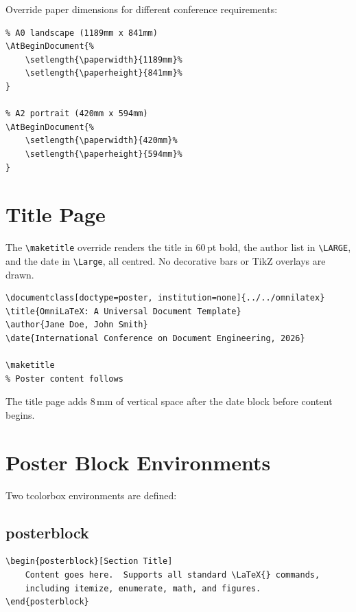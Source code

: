Override paper dimensions for different conference requirements:

\begin{verbatim}
% A0 landscape (1189mm x 841mm)
\AtBeginDocument{%
    \setlength{\paperwidth}{1189mm}%
    \setlength{\paperheight}{841mm}%
}

% A2 portrait (420mm x 594mm)
\AtBeginDocument{%
    \setlength{\paperwidth}{420mm}%
    \setlength{\paperheight}{594mm}%
}
\end{verbatim}

\section{Title Page}

The \texttt{\textbackslash maketitle} override renders the title in 60\,pt
bold, the author list in \texttt{\textbackslash LARGE}, and the date in
\texttt{\textbackslash Large}, all centred.  No decorative bars or TikZ
overlays are drawn.

\begin{verbatim}
\documentclass[doctype=poster, institution=none]{../../omnilatex}
\title{OmniLaTeX: A Universal Document Template}
\author{Jane Doe, John Smith}
\date{International Conference on Document Engineering, 2026}

\maketitle
% Poster content follows

\end{verbatim}

The title page adds 8\,mm of vertical space after the date block before
content begins.

\section{Poster Block Environments}

Two tcolorbox environments are defined:

\subsection{posterblock}

\begin{verbatim}
\begin{posterblock}[Section Title]
    Content goes here.  Supports all standard \LaTeX{} commands,
    including itemize, enumerate, math, and figures.
\end{posterblock}
\end{verbatim}

